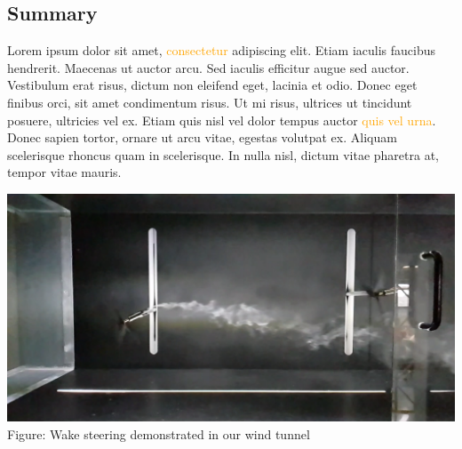 \documentclass[wind]{tudposter} %
\begin{document}
\LARGE %


\setmainfont[Ligatures=TeX,Path=./fonts/,BoldItalicFont=calibrii.ttf,BoldFont=calibri.ttf,ItalicFont=calibrili.ttf]{calibril.ttf}
\begin{multicols}{2} %


\section{Summary}
Lorem ipsum dolor sit amet, \textcolor{orange}{consectetur} adipiscing elit. Etiam iaculis faucibus hendrerit. Maecenas ut auctor arcu. Sed iaculis efficitur \textcolor{tudblue}{augue sed auctor}. Vestibulum erat risus, dictum non eleifend eget, lacinia et odio. Donec eget finibus orci, sit amet condimentum risus. Ut mi risus, ultrices ut tincidunt posuere, ultricies vel ex. Etiam quis nisl vel dolor tempus auctor \textcolor{orange}{quis vel urna}. Donec sapien tortor, ornare ut arcu vitae, egestas volutpat ex. Aliquam scelerisque rhoncus quam in scelerisque. In nulla nisl, dictum vitae pharetra at, tempor \textcolor{tudblue}{vitae mauris}.\\

\begin{minipage}{\linewidth}
	\centering
	\vspace{5mm}
	\includegraphics[width=\linewidth]{images/windtunnel.png}
	{Figure: Wake steering demonstrated in our wind tunnel} %
	\vspace{1cm}
\end{minipage}


\end{multicols}
\end{document}
